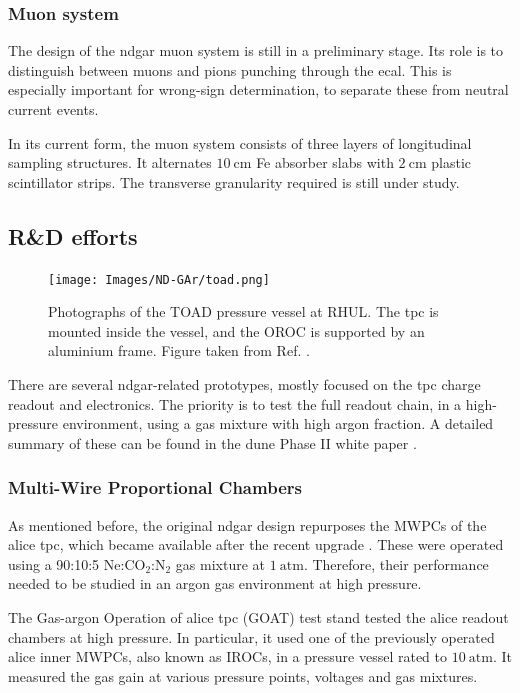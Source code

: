 \subsubsection{Muon system}

The design of the \gls{ndgar} muon system is still in a preliminary stage. Its role is to distinguish between muons and pions punching through the \gls{ecal}. This is especially important for wrong-sign determination, to separate these from neutral current events.

In its current form, the muon system consists of three layers of longitudinal sampling structures. It alternates $10~\mathrm{cm}$ Fe absorber slabs with $2~\mathrm{cm}$ plastic scintillator strips. The transverse granularity required is still under study.

\subsection{R\&D efforts}

\begin{figure}[t]
	\centering
	\texttt{[image: Images/ND-GAr/toad.png]}
	\caption[Photographs of the TOAD pressure vessel at RHUL.]{Photographs of the TOAD pressure vessel at RHUL. The \gls{tpc} is mounted inside the vessel, and the OROC is supported by an aluminium frame. Figure taken from Ref. \cite{Ritchie-Yates2023}.}
	\label{fig:toad}
\end{figure}

There are several \gls{ndgar}-related prototypes, mostly focused on the \gls{tpc} charge readout and electronics. The priority is to test the full readout chain, in a high-pressure environment, using a gas mixture with high argon fraction. A detailed summary of these can be found in the \gls{dune} Phase II white paper \cite{DUNE2024Phase2}.

\subsubsection{Multi-Wire Proportional Chambers}

As mentioned before, the original \gls{ndgar} design repurposes the MWPCs of the \gls{alice} \gls{tpc}, which became available after the recent upgrade \cite{ALICETPC2020}. These were operated using a 90:10:5 $\mathrm{Ne}$:$\mathrm{CO}_{2}$:$\mathrm{N}_{2}$ gas mixture at $1~\mathrm{atm}$. Therefore, their performance needed to be studied in an argon gas environment at high pressure.

The Gas-argon Operation of \gls{alice} \gls{tpc} (GOAT) test stand tested the \gls{alice} readout chambers at high pressure. In particular, it used one of the previously operated \gls{alice} inner MWPCs, also known as IROCs, in a pressure vessel rated to $10~\mathrm{atm}$. It measured the gas gain at various pressure points, voltages and gas mixtures.


